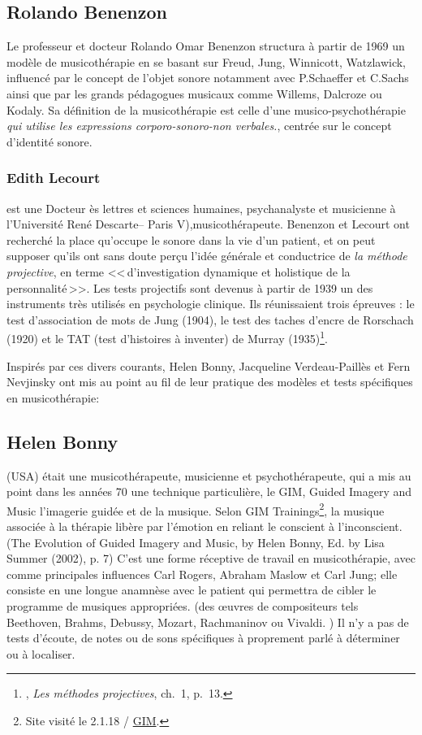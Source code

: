 	  \subsection{Rolando Benenzon} Le professeur et docteur Rolando Omar Benenzon structura à partir de 1969 un modèle de musicothérapie en se basant sur Freud, Jung, Winnicott, Watzlawick, influencé par le concept de l'objet sonore notamment avec P.Schaeffer et C.Sachs ainsi que par les grands pédagogues musicaux comme Willems, Dalcroze ou Kodaly. Sa définition de la musicothérapie est celle d'une musico-psychothérapie  \emph{\textsl{qui utilise les expressions corporo-sonoro-non verbales.}}, centrée sur le concept d'identité sonore.

        \subsubsection{Edith Lecourt} est une Docteur ès lettres et sciences humaines, psychanalyste et musicienne à l'Université René Descarte-- Paris V),musicothérapeute.
        Benenzon et Lecourt ont  recherché la place qu'occupe le sonore dans la vie d'un patient, et on peut supposer qu'ils ont sans doute perçu l'idée générale et conductrice de \emph{la méthode projective}, en terme 
	    <<\,d'investigation dynamique et holistique de la
        personnalité\,>>. Les tests projectifs sont devenus à partir
        de 1939 un des instruments très utilisés en psychologie
        clinique. Ils réunissaient trois épreuves : le test
        d'association de mots de Jung (1904), le test des taches
        d'encre de Rorschach (1920) et le TAT (test d'histoires à
        inventer) de Murray (1935)\footnote{\cite{anzieu.chabert:methodes}, \emph{Les méthodes projectives}, ch.~1, p.~13.}.
		

	
Inspirés par ces divers courants, Helen Bonny, Jacqueline Verdeau-Paillès et Fern Nevjinsky ont  mis au point au fil de leur pratique des modèles et tests spécifiques en musicothérapie:


\subsection{Helen Bonny} (USA) était une musicothérapeute,
musicienne et psychothérapeute, qui a mis au point dans les années 70
une technique particulière, le GIM, \og Guided Imagery and Music\fg
l'imagerie guidée et de la musique. Selon GIM
Trainings\footnote{Site visité le 2.1.18 / \href{\#gimsite}{GIM}.}, la
musique associée à la thérapie libère par l'émotion en reliant le
conscient à l'inconscient.(The Evolution of Guided Imagery and Music, by Helen Bonny, Ed. by Lisa Summer (2002), p. 7)
 C'est une forme réceptive de travail
en musicothérapie, avec comme principales influences Carl Rogers, Abraham Maslow et Carl Jung; elle  consiste en une longue anamnèse avec le
patient qui permettra de cibler le programme de musiques appropriées. 
(des \oe uvres de compositeurs tels Beethoven, Brahms, Debussy,
Mozart, Rachmaninov ou Vivaldi. )
Il n'y a  pas de
tests d'écoute, de notes ou de sons spécifiques à proprement parlé à déterminer ou à localiser.

